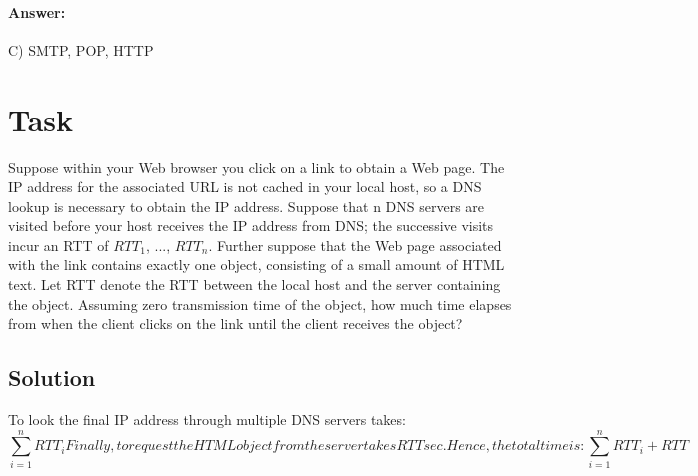 \documentclass[11pt]{article}
\begin{document}
    \paragraph{Answer:}  C) SMTP, POP, HTTP
    \newpage


    \section{Task}\label{sec:task_3}
    Suppose within your Web browser you click on a link to obtain a Web page.
    The IP address for the associated URL is not cached in your local host,
    so a DNS lookup is necessary to obtain the IP address.
    Suppose that n DNS servers are visited before your host receives the IP address from DNS;
    the successive visits incur an RTT of $RTT_1$, ..., $RTT_n$.
    Further suppose that the Web page associated with the link contains exactly one object,
    consisting of a small amount of HTML text.
    Let RTT denote the RTT between the local host and the server containing the object.
    Assuming zero transmission time of the object,
    how much time elapses from when the client clicks on the link until the client receives the object?

    \subsection{Solution}
    To look the final IP address through multiple DNS servers takes:
    \begin{subequations}
        \begin{equation}
            \sum_{i=1}^{n} RTT_{i}
        \end{equation}
        Finally, to request the HTML object from the server takes RTT sec.
        Hence, the total time is:
        \begin{equation}
            \sum_{i=1}^{n} RTT_{i} + RTT
        \end{equation}
    \end{subequations}
    \newpage
\end{document}
